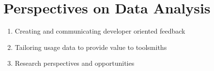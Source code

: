 \section{ Perspectives on Data Analysis}


\begin{enumerate}
\item Creating and communicating developer oriented feedback
\item Tailoring usage data to provide value to toolsmiths
\item Research perspectives and opportunities
\end{enumerate}